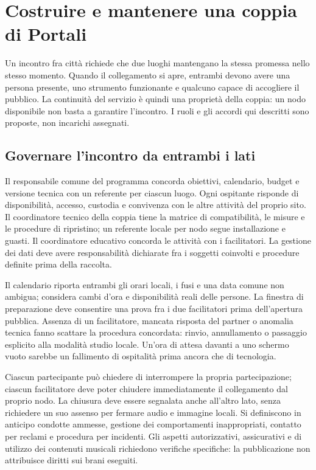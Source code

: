 \chapter{Costruire e mantenere una coppia di Portali}\label{sec:delivery}

Un incontro fra città richiede che due luoghi mantengano la stessa promessa
nello stesso momento. Quando il collegamento si apre, entrambi devono
avere una persona presente, uno strumento funzionante e qualcuno capace
di accogliere il pubblico. La continuità del servizio è quindi una proprietà
della coppia: un nodo disponibile non basta a garantire l'incontro.
I ruoli e gli accordi qui descritti sono proposte, non incarichi assegnati.

\section{Governare l'incontro da entrambi i lati}
Il responsabile comune del programma concorda obiettivi, calendario,
budget e versione tecnica con un referente per ciascun luogo.
Ogni ospitante risponde di disponibilità, accesso, custodia e convivenza
con le altre attività del proprio sito. Il coordinatore tecnico della
coppia tiene la matrice di compatibilità, le misure e le procedure di
ripristino; un referente locale per nodo segue installazione e guasti.
Il coordinatore educativo concorda le attività con i facilitatori.
La gestione dei dati deve avere responsabilità dichiarate fra i soggetti
coinvolti e procedure definite prima della raccolta.

Il calendario riporta entrambi gli orari locali, i fusi e una data comune
non ambigua; considera cambi d'ora e disponibilità reali delle persone.
La finestra di preparazione deve consentire una prova fra i due facilitatori
prima dell'apertura pubblica. Assenza di un facilitatore, mancata risposta
del partner o anomalia tecnica fanno scattare la procedura concordata:
rinvio, annullamento o passaggio esplicito alla modalità studio locale.
Un'ora di attesa davanti a uno schermo vuoto sarebbe un fallimento di
ospitalità prima ancora che di tecnologia.

Ciascun partecipante può chiedere di interrompere la propria partecipazione;
ciascun facilitatore deve poter chiudere immediatamente il collegamento dal
proprio nodo. La chiusura deve essere segnalata anche all'altro lato, senza
richiedere un suo assenso per fermare audio e immagine locali. Si definiscono
in anticipo condotte ammesse, gestione dei comportamenti inappropriati,
contatto per reclami e procedura per incidenti. Gli aspetti autorizzativi,
assicurativi e di utilizzo dei contenuti musicali richiedono verifiche
specifiche: la pubblicazione non attribuisce diritti sui brani eseguiti.

